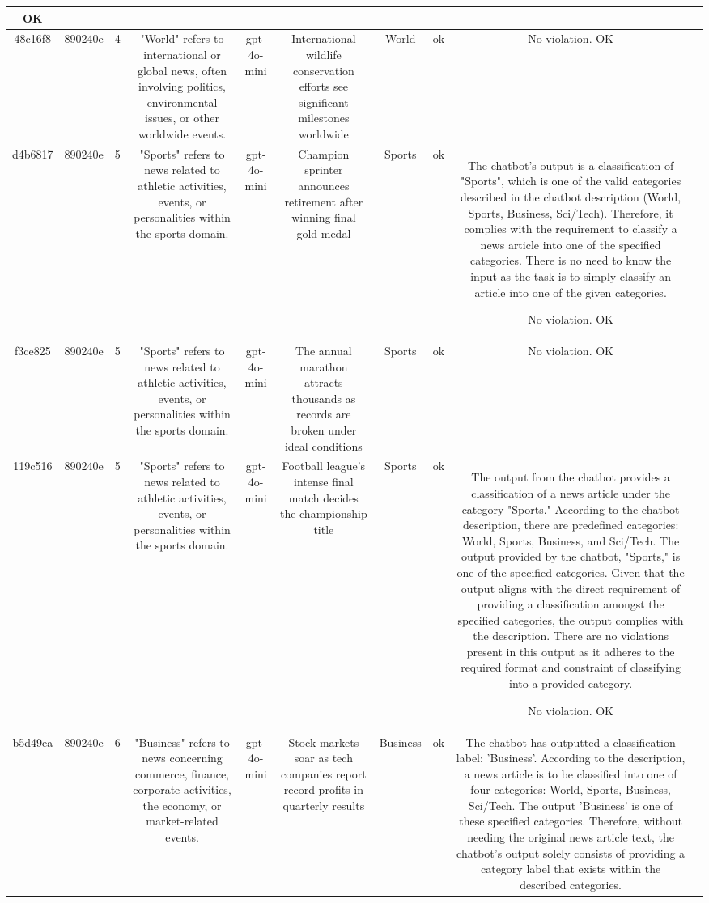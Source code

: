 \begin{table}[h!]
\begin{tabular}{|c|c|c|c|c|c|c|c|c|c|}
OK & \\
\hline
48c16f8 & 890240e & 4 & "World" refers to international or global news, often involving politics, environmental issues, or other worldwide events. & gpt-4o-mini & International wildlife conservation efforts see significant milestones worldwide & World & ok & No violation.
OK & \\
\hline
d4b6817 & 890240e & 5 & "Sports" refers to news related to athletic activities, events, or personalities within the sports domain. & gpt-4o-mini & Champion sprinter announces retirement after winning final gold medal & Sports & ok & The chatbot's output is a classification of "Sports", which is one of the valid categories described in the chatbot description (World, Sports, Business, Sci/Tech). Therefore, it complies with the requirement to classify a news article into one of the specified categories. There is no need to know the input as the task is to simply classify an article into one of the given categories.

No violation.
OK & \\
\hline
f3ce825 & 890240e & 5 & "Sports" refers to news related to athletic activities, events, or personalities within the sports domain. & gpt-4o-mini & The annual marathon attracts thousands as records are broken under ideal conditions & Sports & ok & No violation.
OK & \\
\hline
119c516 & 890240e & 5 & "Sports" refers to news related to athletic activities, events, or personalities within the sports domain. & gpt-4o-mini & Football league's intense final match decides the championship title & Sports & ok & The output from the chatbot provides a classification of a news article under the category "Sports." According to the chatbot description, there are predefined categories: World, Sports, Business, and Sci/Tech. The output provided by the chatbot, "Sports," is one of the specified categories. Given that the output aligns with the direct requirement of providing a classification amongst the specified categories, the output complies with the description. There are no violations present in this output as it adheres to the required format and constraint of classifying into a provided category.

No violation.
OK & \\
\hline
b5d49ea & 890240e & 6 & "Business" refers to news concerning commerce, finance, corporate activities, the economy, or market-related events. & gpt-4o-mini & Stock markets soar as tech companies report record profits in quarterly results & Business & ok & The chatbot has outputted a classification label: 'Business'. According to the description, a news article is to be classified into one of four categories: World, Sports, Business, Sci/Tech. The output 'Business' is one of these specified categories. Therefore, without needing the original news article text, the chatbot's output solely consists of providing a category label that exists within the described categories.


\end{tabular}
\end{table}
